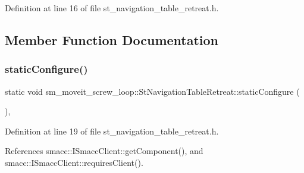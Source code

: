 Definition at line 16 of file st\+\_\+navigation\+\_\+table\+\_\+retreat.\+h.



\subsection{Member Function Documentation}
\mbox{\label{structsm__moveit__screw__loop_1_1StNavigationTableRetreat_a44efd3dfb0eed47259e7817d62151e5d}} 
\subsubsection{\texorpdfstring{static\+Configure()}{staticConfigure()}}
{\footnotesize\ttfamily static void sm\+\_\+moveit\+\_\+screw\+\_\+loop\+::\+St\+Navigation\+Table\+Retreat\+::static\+Configure (\begin{DoxyParamCaption}{ }\end{DoxyParamCaption})\hspace{0.3cm}{\ttfamily [inline]}, {\ttfamily [static]}}



Definition at line 19 of file st\+\_\+navigation\+\_\+table\+\_\+retreat.\+h.



References smacc\+::\+I\+Smacc\+Client\+::get\+Component(), and smacc\+::\+I\+Smacc\+Client\+::requires\+Client().


